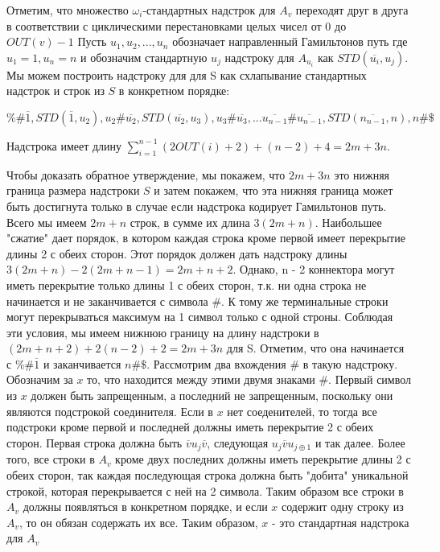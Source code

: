 \documentclass[11pt,a4paper]{article}
\begin{document}
 Отметим, что множество $\omega_i$-стандартных надстрок для $A_v$ переходят друг в друга в соответствии с циклическими перестановками целых чисел от $0$ до $OUT(v) - 1$
Пусть $u_1, u_2, ..., u_n$ обозначает направленный Гамильтонов путь где $u_1 = 1, u_n = n$ и обозначим стандартную $u_j$ надстроку для $A_{u_i}$ как $STD(\overline{u_i}, u_j)$.
Мы можем построить надстроку для для S как схлапывание стандартных надстрок и строк из $S$ в конкретном порядке:
\begin{center}
$\%\#\overline{1}, STD(\overline{1}, u_2), u_2 \# \overline{u_2}, STD(\overline{u_2}, u_3), u_3\#\overline{u_3}, ...
\overline{u_{n - 1}}\#\overline{u_{n - 1}}, STD(\overline{n_{n - 1}}, n), n\#\$$
\end{center}
Надстрока имеет длину $\sum\limits_{i = 1}^{n - 1} (2OUT(i) + 2) + (n - 2) + 4 = 2m + 3n$.
\par
Чтобы доказать обратное утверждение, мы покажем, что $2m + 3n$ это нижняя граница размера надстроки $S$ и затем покажем, что эта нижняя граница может быть достигнута только в случае если надстрока
кодирует Гамильтонов путь. Всего мы имеем $2m + n$ строк, в сумме их длина $3(2m + n)$. Наибольшее "сжатие" дает порядок, в котором каждая строка кроме первой имеет перекрытие длины 2 с обеих сторон.
Этот порядок должен дать надстроку длины $3(2m + n) - 2(2m + n - 1) = 2m + n + 2$. Однако, n - 2 коннектора могут иметь перекрытие только длины 1 с обеих сторон,
т.к. ни одна строка не начинается и не заканчивается с символа $\#$.
К тому же терминальные строки могут перекрываться максимум на 1 символ только с одной строны. Соблюдая эти условия, мы имеем нижнюю границу на длину надстроки в
$(2m + n + 2) + 2(n - 2) + 2 = 2m + 3n$ для S. Отметим, что она начинается с $\%\#\overline{1}$ и заканчивается $n\#\$$.
Рассмотрим два вхождения $\#$ в такую надстроку. Обозначим за $x$ то, что находится между этими двумя знаками $\#$. Первый символ из $x$ должен быть запрещенным, а
последний не запрещенным, поскольку они являются подстрокой соединителя. Если в $x$ нет соеденителей, то тогда все подстроки кроме первой и последней должны иметь перекрытие 2 с обеих сторон.
Первая строка должна быть $\overline{v}u_j\overline{v}$, следующая $u_j\overline{v}u_{j \oplus 1}$ и так далее. Более того, все строки в $A_v$ кроме двух последних должны иметь перекрытие длины 2
с обеих сторон, так каждая последующая строка должна быть "добита" уникальной строкой, которая перекрывается с ней на 2 символа. Таким образом все строки в $A_v$ должны появляться в
конкретном порядке, и если $x$ содержит одну строку из $A_v$, то он обязан содержать их все. Таким образом, $x$ - это стандартная надстрока для $A_v$
\end{document}
